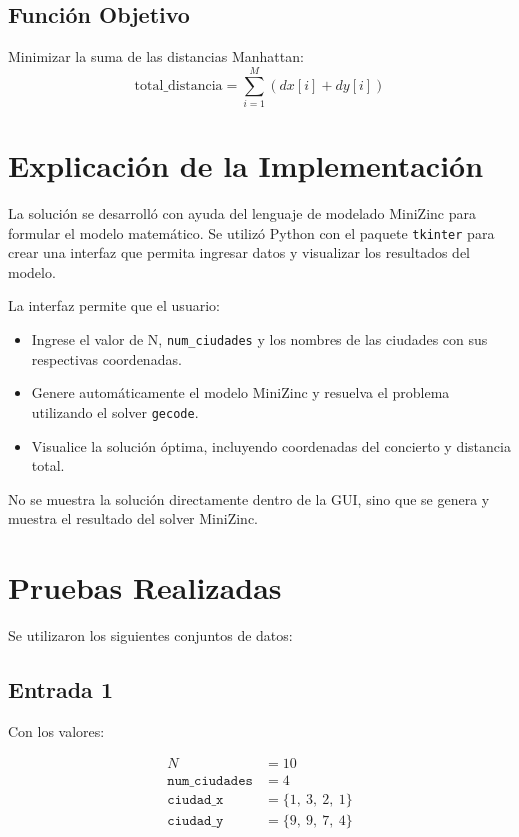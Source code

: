 \documentclass[conference]{IEEEtran}
\begin{document}
\subsection{Función Objetivo}
Minimizar la suma de las distancias Manhattan:
\begin{equation}
	\text{total\_distancia} = \sum_{i=1}^{M} (dx[i] + dy[i])
\end{equation}

\section{Explicación de la Implementación}
La solución se desarrolló con ayuda del lenguaje de modelado MiniZinc
para formular el modelo matemático. Se utilizó Python con el paquete \texttt{tkinter} para
crear una interfaz que permita ingresar datos y visualizar los
resultados del modelo.

La interfaz permite que el usuario:

\begin{itemize}
	\item
	Ingrese el valor de N, \texttt{num\_ciudades} y los nombres de las ciudades con
	sus respectivas coordenadas.
	\item
	Genere automáticamente el modelo MiniZinc y resuelva el problema
	utilizando el solver \texttt{gecode}.
	\item
	Visualice la solución óptima, incluyendo coordenadas del concierto y
	distancia total.
\end{itemize}

No se muestra la solución directamente dentro de la GUI, sino que se
genera y muestra el resultado del solver MiniZinc.

\section{Pruebas Realizadas}
Se utilizaron los siguientes conjuntos de datos:

\subsection{Entrada 1}

Con los valores:

\begin{align*}
	N &= 10 \\
	\texttt{num\_ciudades} &= 4 \\
	\texttt{ciudad\_x} &= \{1,\ 3,\ 2,\ 1\} \\
	\texttt{ciudad\_y} &= \{9,\ 9,\ 7,\ 4\}
\end{align*}
\end{document}

